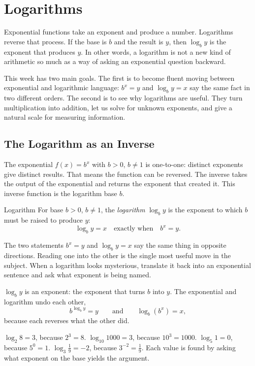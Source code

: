 \documentclass[12pt]{book}
\begin{document}
\chapter{Logarithms}

Exponential functions take an exponent and produce a number. Logarithms reverse that
process. If the base is $b$ and the result is $y$, then $\log_b y$ is the exponent
that produces $y$. In other words, a logarithm is not a new kind of arithmetic so much
as a way of asking an exponential question backward.

This week has two main goals. The first is to become fluent moving between exponential
and logarithmic language: $b^x=y$ and $\log_b y=x$ say the same fact in two different
orders. The second is to see why logarithms are useful. They turn multiplication into
addition, let us solve for unknown exponents, and give a natural scale for measuring
information.

\section{The Logarithm as an Inverse}

The exponential $f(x)=b^{x}$ with $b>0$, $b\neq1$ is one-to-one: distinct exponents
give distinct results. That means the function can be reversed. The inverse takes the
output of the exponential and returns the exponent that created it. This inverse function
is the logarithm base $b$.

\begin{definition}{Logarithm}
For base $b>0$, $b\neq1$, the \emph{logarithm} $\log_b y$ is the exponent to which $b$
must be raised to produce $y$:
\[
\log_b y = x \quad\text{exactly when}\quad b^{x}=y.
\]
\end{definition}

The two statements $b^{x}=y$ and $\log_b y=x$ say the same thing in opposite
directions. Reading one into the other is the single most useful move in the subject.
When a logarithm looks mysterious, translate it back into an exponential sentence and
ask what exponent is being named.

\newpage
\begin{keyidea}
$\log_b y$ is an exponent: the exponent that turns $b$ into $y$. The exponential and
logarithm undo each other,
\[
b^{\log_b y}=y \qquad\text{and}\qquad \log_b\!\left(b^{x}\right)=x,
\]
because each reverses what the other did.
\end{keyidea}

\begin{example}
$\log_2 8 = 3$, because $2^{3}=8$. $\log_{10}1000=3$, because $10^{3}=1000$.
$\log_5 1=0$, because $5^{0}=1$. $\log_3\tfrac19=-2$, because $3^{-2}=\tfrac19$. Each
value is found by asking what exponent on the base yields the argument.
\end{example}
\end{document}
